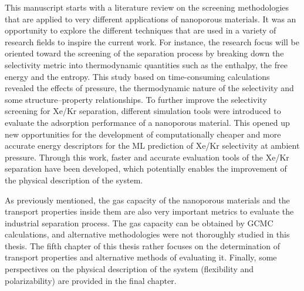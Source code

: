 This manuscript starts with a literature review on the screening methodologies that are applied to very different applications of nanoporous materials. It was an opportunity to explore the different techniques that are used in a variety of research fields to inspire the current work.\autocite{Ren_2022} For instance, the research focus will be oriented toward the screening of the separation process by breaking down the selectivity metric into thermodynamic quantities such as the enthalpy, the free energy and the entropy. This study based on time-consuming calculations revealed the effects of pressure, the thermodynamic nature of the selectivity and some structure--property relationships.\autocite{Ren_2021} To further improve the selectivity screening for Xe/Kr separation, different simulation tools were introduced to evaluate the adsorption performance of a nanoporous material.\autocite{Ren_2023} This opened up new opportunities for the development of computationally cheaper and more accurate energy descriptors for the ML prediction of Xe/Kr selectivity at ambient pressure.\autocite{Ren_2023_ml} Through this work, faster and accurate evaluation tools of the Xe/Kr separation have been developed, which potentially enables the improvement of the physical description of the system. 

As previously mentioned, the gas capacity of the nanoporous materials and the transport properties inside them are also very important metrics to evaluate the industrial separation process. The gas capacity can be obtained by GCMC calculations, and alternative methodologies were not thoroughly studied in this thesis. The fifth chapter of this thesis rather focuses on the determination of transport properties and alternative methods of evaluating it. Finally, some perspectives on the physical description of the system (flexibility and polarizability) are provided in the final chapter.


\vfill
\begin{center}
\end{center}
\vfill\vfill